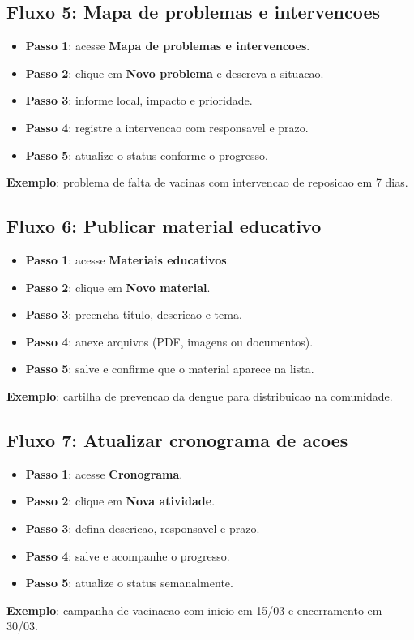 \documentclass[12pt,a4paper]{article}
\begin{document}
\subsection{Fluxo 5: Mapa de problemas e intervencoes}
\begin{itemize}[leftmargin=*]
  \item \textbf{Passo 1}: acesse \textbf{Mapa de problemas e intervencoes}.
  \item \textbf{Passo 2}: clique em \textbf{Novo problema} e descreva a situacao.
  \item \textbf{Passo 3}: informe local, impacto e prioridade.
  \item \textbf{Passo 4}: registre a intervencao com responsavel e prazo.
  \item \textbf{Passo 5}: atualize o status conforme o progresso.
\end{itemize}
\textbf{Exemplo}: problema de falta de vacinas com intervencao de reposicao em 7 dias.

\subsection{Fluxo 6: Publicar material educativo}
\begin{itemize}[leftmargin=*]
  \item \textbf{Passo 1}: acesse \textbf{Materiais educativos}.
  \item \textbf{Passo 2}: clique em \textbf{Novo material}.
  \item \textbf{Passo 3}: preencha titulo, descricao e tema.
  \item \textbf{Passo 4}: anexe arquivos (PDF, imagens ou documentos).
  \item \textbf{Passo 5}: salve e confirme que o material aparece na lista.
\end{itemize}
\textbf{Exemplo}: cartilha de prevencao da dengue para distribuicao na comunidade.

\subsection{Fluxo 7: Atualizar cronograma de acoes}
\begin{itemize}[leftmargin=*]
  \item \textbf{Passo 1}: acesse \textbf{Cronograma}.
  \item \textbf{Passo 2}: clique em \textbf{Nova atividade}.
  \item \textbf{Passo 3}: defina descricao, responsavel e prazo.
  \item \textbf{Passo 4}: salve e acompanhe o progresso.
  \item \textbf{Passo 5}: atualize o status semanalmente.
\end{itemize}
\textbf{Exemplo}: campanha de vacinacao com inicio em 15/03 e encerramento em 30/03.
\end{document}
